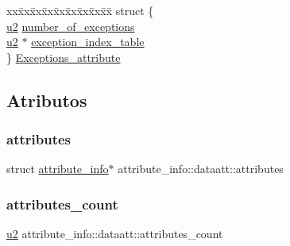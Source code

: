 \begin{DoxyCompactItemize}
\begin{tabbing}
\end{tabbing}\item 
\begin{tabbing}
xx\=xx\=xx\=xx\=xx\=xx\=xx\=xx\=xx\=\kill
struct \{\\
\>\hyperlink{ClassLoader_8h_a5f223212eef04d10a4550ded680cb1cf}{u2} \hyperlink{unionattribute__info_1_1dataatt_a6c0783aaa8139388956c2d325ea0e904}{number\_of\_exceptions}\\
\>\hyperlink{ClassLoader_8h_a5f223212eef04d10a4550ded680cb1cf}{u2} $\ast$ \hyperlink{unionattribute__info_1_1dataatt_ac88c57d4da20ece664c3c9afda924cdc}{exception\_index\_table}\\
\} \hyperlink{unionattribute__info_1_1dataatt_abe0efcf86b26c61e1252bdc8ed57f16f}{Exceptions\_attribute}\\

\end{tabbing}\end{DoxyCompactItemize}


\subsection{Atributos}
\mbox{\label{unionattribute__info_1_1dataatt_a3e6b34fe04111fe1a6b2d386d7c7e4f3}} 
\subsubsection{\texorpdfstring{attributes}{attributes}}
{\footnotesize\ttfamily struct \hyperlink{structattribute__info}{attribute\+\_\+info}$\ast$ attribute\+\_\+info\+::dataatt\+::attributes}

\mbox{\label{unionattribute__info_1_1dataatt_a2684a4c2f7e2e9bf618563c5aa3f0bad}} 
\subsubsection{\texorpdfstring{attributes\+\_\+count}{attributes\_count}}
{\footnotesize\ttfamily \hyperlink{ClassLoader_8h_a5f223212eef04d10a4550ded680cb1cf}{u2} attribute\+\_\+info\+::dataatt\+::attributes\+\_\+count}

